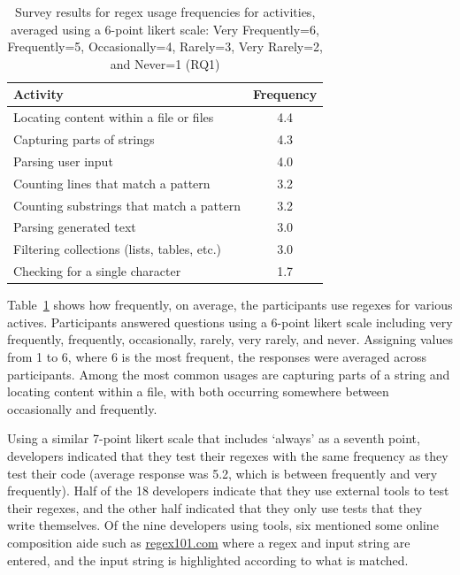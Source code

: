 \begin{table}
\caption{Survey results for regex usage frequencies for  activities, averaged using a 6-point likert scale: Very Frequently=6, Frequently=5, Occasionally=4, Rarely=3, Very Rarely=2, and Never=1 (RQ1)\label{tab:regexactivities}}
\begin{center}
\begin{small}
\begin{tabular}{l|c}
\toprule
\textbf{Activity} & \textbf{Frequency} \\  \hline \bigstrut
Locating content within a file or files & 4.4\\ \hline \bigstrut
Capturing parts of strings & 4.3 \\ \hline \bigstrut
Parsing user input & 4.0\\ \hline \bigstrut
Counting lines that match a pattern & 3.2\\ \hline \bigstrut
Counting  substrings that match a pattern & 3.2\\  \hline \bigstrut
Parsing generated text & 3.0\\  \hline \bigstrut
Filtering collections (lists, tables, etc.) & 3.0 \\ \hline \bigstrut
Checking for a single character & 1.7\\
\bottomrule
\end{tabular}
\end{small}
\end{center}
\end{table}

Table~\ref{tab:regexactivities} shows how frequently, on average, the participants use
regexes for various actives.
Participants answered questions using a 6-point likert scale including very frequently, frequently, occasionally, rarely, very rarely, and never.
Assigning values from 1 to 6, where 6 is the most frequent, the responses were averaged across participants.
Among the most common usages are capturing parts of a string and locating content within a file, with both occurring somewhere between occasionally and frequently.

Using a similar 7-point likert scale that includes `always' as a seventh point, developers indicated that they test their regexes with the same frequency as they test their code (average response was 5.2, which is between frequently and very frequently).  Half of the 18 developers indicate that they use external tools to test their regexes, and the other half indicated that they only use tests that they write themselves. Of the nine developers using tools, six mentioned some online composition aide such as \url{regex101.com} where a regex and input string are entered, and the input string is highlighted according to what is matched.

